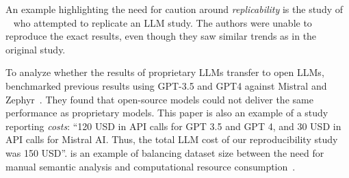 
An example highlighting the need for caution around \emph{replicability} is the study of \citeauthor{DBLP:conf/sigir-ap/StaudingerKPLH24}~\cite{DBLP:conf/sigir-ap/StaudingerKPLH24} who attempted to replicate an LLM study.
The authors were unable to reproduce the exact results, even though they saw similar trends as in the original study.

To analyze whether the results of proprietary LLMs transfer to open LLMs, \citeauthor{DBLP:conf/sigir-ap/StaudingerKPLH24} benchmarked previous results using GPT-3.5 and GPT4 against Mistral and Zephyr~\cite{DBLP:conf/sigir-ap/StaudingerKPLH24}.
They found that open-source models could not deliver the same performance as proprietary models. %
This paper is also an example of a study reporting \emph{costs}: \enquote{120 USD in API calls for GPT 3.5 and GPT 4, and 30 USD in API calls for Mistral AI. Thus, the total LLM cost of our reproducibility study was 150 USD}.
\citeauthor{tinnessoftware} is an example of balancing dataset size between the need for manual semantic analysis and computational resource consumption~\cite{tinnessoftware}.

